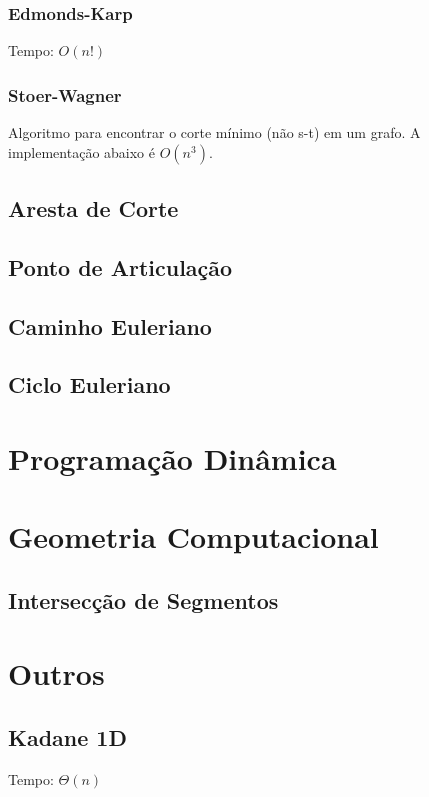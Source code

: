 \documentclass[12pt,a4paper]{article}
\begin{document}
			\subsubsection{Edmonds-Karp}
				Tempo: \( O(n!) \) %
				
			\subsubsection{Stoer-Wagner}
				Algoritmo para encontrar o corte mínimo (não s-t) em um grafo. A implementação abaixo é \(O(n^3)\).
				
		\subsection{Aresta de Corte}
			
		\subsection{Ponto de Articulação}
			
		\subsection{Caminho Euleriano}
		\subsection{Ciclo Euleriano}

	\section{Programação Dinâmica}
	
	\section{Geometria Computacional}
		\subsection{Intersecção de Segmentos}
			

	\section{Outros}
		\subsection{Kadane 1D}
			Tempo: \(\Theta(n)\)
			
\end{document}
